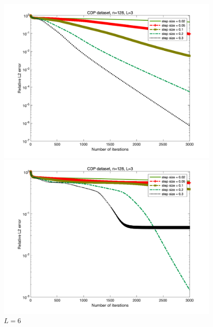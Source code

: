 \documentclass{article}
\begin{document}
\begin{figure}
	\begin{minipage}{0.33\linewidth}
		\centering
		\includegraphics[width=1\linewidth]{./fig/CDP+11.png}
		\caption{$L=3$}
	\end{minipage}
	\begin{minipage}{0.33\linewidth}
		\centering
		\includegraphics[width=1\linewidth]{./fig/CDP+12.png}
		\caption{$L=6$}
	\end{minipage}
	\begin{minipage}{0.33\linewidth}
		\centering

\end{minipage}
\end{figure}
\end{document}
